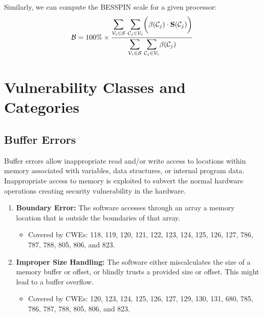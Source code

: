 \documentclass{article}
\begin{document}
Similarly, we can compute the BESSPIN scale for a given processor:
\begin{equation}
\mathcal{B} =
    100\% \times \frac{
      \mathlarger{\mathlarger{\sum}}_{\mathcal{V}_{i} \in \mathcal{S}} \ \mathlarger{\mathlarger{\sum}}_{\mathcal{C}_{j} \in \mathcal{V}_{i}} \bigg( \beta(\mathcal{C}_{j}) \cdot \mathbf{S}(\mathcal{C}_{j}) \bigg)
    }{
      \mathlarger{\mathlarger{\sum}}_{\mathcal{V}_{i} \in \mathcal{S}} \ \mathlarger{\mathlarger{\sum}}_{\mathcal{C}_{j} \in \mathcal{V}_{i}} \beta(\mathcal{C}_{j})
    } 
\end{equation}

\section{Vulnerability Classes and Categories}
\label{sec:classes}

\subsection{Buffer Errors}
Buffer errors allow inappropriate read and/or write access to locations within memory associated with variables, data structures, or internal program data. Inappropriate access to memory is exploited to subvert the normal hardware operations creating security vulnerability in the hardware.
\begin{enumerate}
    \item \textbf{Boundary Error:} The software accesses through an array a memory location that is outside the boundaries of that array.
    \begin{itemize}
        \item Covered by CWEs: 118, 119, 120, 121, 122, 123, 124, 125, 126, 127, 786, 787, 788, 805, 806, and 823.
    \end{itemize}
    
    \item \textbf{Improper Size Handling:} The software either miscalculates the size of a memory buffer or offset, or blindly trusts a provided size or offset. This might lead to a buffer overflow.
    \begin{itemize}
        \item Covered by CWEs: 120, 123, 124, 125, 126, 127, 129, 130, 131, 680, 785, 786, 787, 788, 805, 806, and 823.
    \end{itemize}
\end{enumerate}
\end{document}
